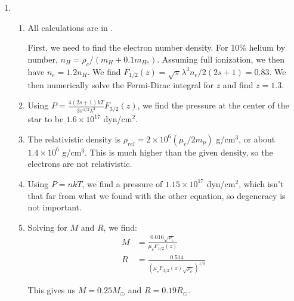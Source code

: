 \documentclass[11pt]{article}
\begin{document}
\begin{enumerate}
\item
	\begin{enumerate}
    \item All calculations are in \url{}.
    
    First, we need to find the electron number density. For 10\% helium by number, $n_H = \rho_c / (m_H + 0.1m_{He})$. Assuming full ionization, we then have $n_e = 1.2 n_H$. We find $F_{1/2}(z) = \sqrt{\pi}\lambda^3n_e/2(2s+1) = 0.83$. We then numerically solve the Fermi-Dirac integral for $z$ and find $z = 1.3$.
    
    \item Using $P = \frac{4(2s+1)kT}{3\pi^{1/2}\lambda^3}F_{3/2}(z)$, we find the pressure at the center of the star to be $1.6 \times 10^{17}$ dyn/cm$^2$.
    
    \item The relativistic density is $\rho_{rel} = 2\times10^6 (\mu_e/2m_p)$ g/cm$^3$, or about $1.4 \times 10^6$ g/cm$^3$. This is much higher than the given density, so the electrons are not relativistic.
    
    \item Using $P = nkT$, we find a pressure of $1.15 \times 10^{17}$ dyn/cm$^2$, which isn't that far from what we found with the other equation, so degeneracy is not important.
    
    \item Solving for $M$ and $R$, we find:
    \begin{align}
    M &= \frac{0.016 \sqrt{\rho_c}}{\mu_e F_{1/2}(z)}  \\
    R &= \frac{0.514}{(\mu_e F_{3/2}(z) \sqrt{\rho_c})^{1/3}}
    \end{align}
    
    This gives us $M = 0.25M_\odot$ and $R = 0.19R_\odot$.
    
    \end{enumerate}

\end{enumerate}
\end{document}
